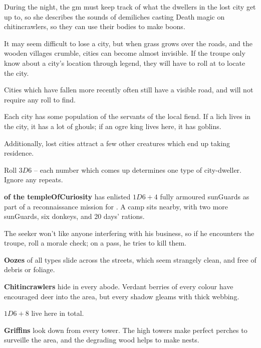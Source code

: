 \begin{multicols}{2}
\begin{exampletext}
  During the night, the \gls{gm} must keep track of what the dwellers in the lost city get up to, so she describes the sounds of demiliches casting Death magic on chitincrawlers, so they can use their bodies to make \glspl{boon}.

\end{exampletext}


It may seem difficult to lose a city, but when grass grows over the roads, and the wooden \glspl{village} crumble, cities can become almost invisible.
If the troupe only know about a city's location through legend, they will have to roll  at \tn[14] to locate the city.

Cities which have fallen more recently often still have a visible road, and will not require any roll to find.

\label{lostDwellers}

Each city has some population of the servants of the local fiend.
If a lich lives in the city, it has a lot of ghouls; if an ogre king lives here, it has goblins.

Additionally, lost cities attract a few other creatures which end up taking residence.

Roll $3D6$ -- each number which comes up determines one type of city-dweller.
Ignore any repeats.

\begin{dlist}
  \item
  \textbf{ of the \gls{templeOfCuriosity}} has enlisted $1D6+4$ fully armoured \glspl{sunGuard} as part of a reconnaissance mission for .
  A camp sits nearby, with two more \glspl{sunGuard}, six donkeys, and 20 days' rations.

  The \gls{seeker} won't like anyone interfering with his business, so if he encounters the troupe, roll a morale check; on a pass, he tries to kill them.
  \item\label{lostOoze}
  \textbf{Oozes} of all types slide across the streets, which seem strangely clean, and free of debris or foliage.
  \item
  \textbf{Chitincrawlers} hide in every abode.
  Verdant berries of every colour have encouraged deer into the area, but every shadow gleams with thick webbing.

  $1D6+8$ live here in total.
  \item
  \textbf{Griffins} look down from every tower.
  The high towers make perfect perches to surveille the area, and the degrading wood helps to make nests.


\end{dlist}
\end{multicols}
